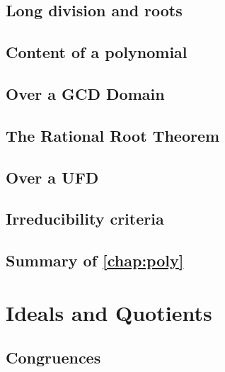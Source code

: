 \documentclass{memoir}
\begin{document}
    \section{Long division and roots}
      \label{sec:poly-div-alg}
      
      \newpage

    \section{Content of a polynomial}
      \label{sec:poly-content}
      
      \newpage

    \section{Over a GCD Domain}
      
      \newpage

    \section{The Rational Root Theorem}
      \label{sec:rat-root-thm}
      
      \newpage

    \section{Over a UFD}
      
      \newpage

    \section{Irreducibility criteria}
      \newpage

    \section*{Summary of \autoref{chap:poly}}
      


  \chapter{Ideals and Quotients}
    \label{chap:quot}
    \newpage

    \section{Congruences}
      \label{sec:congruence}
      
      \newpage
\end{document}
